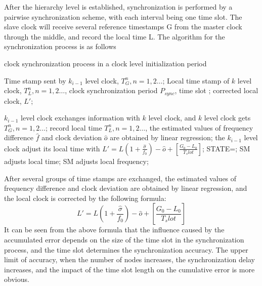 \documentclass[conference]{IEEEtran}
\begin{document}
	After the hierarchy level is established, synchronization is performed by a pairwise synchronization scheme, with each interval being one time slot.
	The slave clock will receive several reference timestamps G from the master clock through the middle, and record the local time L. 
	The algorithm for the synchronization process is as follows
	\begin{algorithm}[ht]  
		\caption{clock synchronization process in a clock level initialization period}  
		\begin{algorithmic}[1]
			\REQUIRE Time stamp sent by $k_{i-1}$ level clock, $T_G^n, n=1,2\ldots$; Local time stamp of $k$ level clock, $T_L^n,n=1,2\ldots$, clock synchronization period $ P_{sync}$, time slot \tau ; 
			\ENSURE corrected local clock, $L'$;
			
			
			\STATE $k_{i-1}$ level clock exchanges information with $k$ level clock, and $k$ level clock gets $T_G^n, n=1,2\ldots$;
			\STATE record local time $T_L^n,n=1,2\ldots$, 
			\ENDIF
			\STATE the estimated values of frequency difference $\widehat{f}$ and clock deviation $\widehat{o}$ are obtained by linear regression;
			\STATE the $k_{i-1}$ level clock adjust its local time with $L' = L(1+\frac{\widehat{\sigma}}{f_0})-\widehat{o}+[\frac{G_0-L_0}{T_slot}]$;
			\ENDIF
			STATE=;
			\STATE SM adjusts local time;
			\ENDIF
			\STATE SM adjusts local frequency;
			\ENDIF
			\ENDWHILE
			\ENDWHILE
		\end{algorithmic}
	\end{algorithm}
	After several groups of time stamps are exchanged, the estimated values of frequency difference and clock deviation are obtained by linear regression, and the local clock is corrected by the following formula:
	\begin{equation}
	L' = L(1+\frac{\widehat{\sigma}}{f_0})-\widehat{o}+[\frac{G_0-L_0}{T_slot}] \tag{2}
	\end{equation}
	It can be seen from the above formula that the influence caused by the accumulated error depends on the size of the time slot in the synchronization process, and the time slot determines the synchronization accuracy.
	The upper limit of accuracy, when the number of nodes increases, the synchronization delay increases, and the impact of the time slot length on the cumulative error is more obvious.
\end{document}

